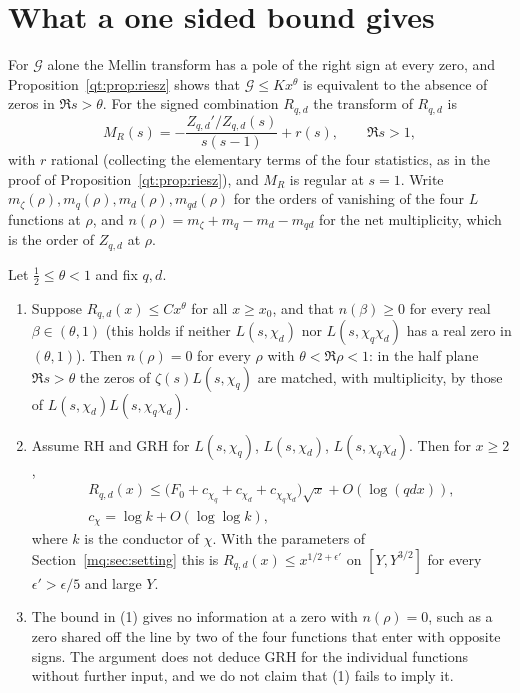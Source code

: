 \section{What a one sided bound gives}\label{mq:sec:onesided}

For $\mathcal G$ alone the Mellin transform has a pole of the right sign at every zero, and Proposition~\ref{qt:prop:riesz} shows that $\mathcal G\le Kx^\theta$ is equivalent to the absence of zeros in $\Re s>\theta$. For the signed combination $R_{q,d}$ the transform of $R_{q,d}$ is
\[
M_R(s)=-\frac{Z_{q,d}'/Z_{q,d}(s)}{s(s-1)}+r(s),\qquad\Re s>1,
\]
with $r$ rational (collecting the elementary terms of the four statistics, as in the proof of Proposition~\ref{qt:prop:riesz}), and $M_R$ is regular at $s=1$. Write $m_\zeta(\rho),m_q(\rho),m_d(\rho),m_{qd}(\rho)$ for the orders of vanishing of the four $L$ functions at $\rho$, and $n(\rho)=m_\zeta+m_q-m_d-m_{qd}$ for the net multiplicity, which is the order of $Z_{q,d}$ at $\rho$.
\begin{proposition}\label{mq:prop:onesided}
Let $\frac12\le\theta<1$ and fix $q,d$.
\begin{enumerate}
\item Suppose $R_{q,d}(x)\le Cx^\theta$ for all $x\ge x_0$, and that $n(\beta)\ge0$ for every real $\beta\in(\theta,1)$ (this holds if neither $L(s,\chi_d)$ nor $L(s,\chi_q\chi_d)$ has a real zero in $(\theta,1)$). Then $n(\rho)=0$ for every $\rho$ with $\theta<\Re\rho<1$: in the half plane $\Re s>\theta$ the zeros of $\zeta(s)L(s,\chi_q)$ are matched, with multiplicity, by those of $L(s,\chi_d)L(s,\chi_q\chi_d)$.
\item Assume RH and GRH for $L(s,\chi_q)$, $L(s,\chi_d)$, $L(s,\chi_q\chi_d)$. Then for $x\ge2$,
\begin{gather*}
R_{q,d}(x)\le\big(F_0+c_{\chi_q}+c_{\chi_d}+c_{\chi_q\chi_d}\big)\sqrt x+O(\log(qdx)),\\ c_\chi=\log k+O(\log\log k),
\end{gather*}
where $k$ is the conductor of $\chi$. With the parameters of Section~\ref{mq:sec:setting} this is $R_{q,d}(x)\le x^{1/2+\epsilon'}$ on $[Y,Y^{3/2}]$ for every $\epsilon'>\epsilon/5$ and large $Y$.
\item The bound in (1) gives no information at a zero with $n(\rho)=0$, such as a zero shared off the line by two of the four functions that enter with opposite signs. The argument does not deduce GRH for the individual functions without further input, and we do not claim that (1) fails to imply it.
\end{enumerate}
\end{proposition}

